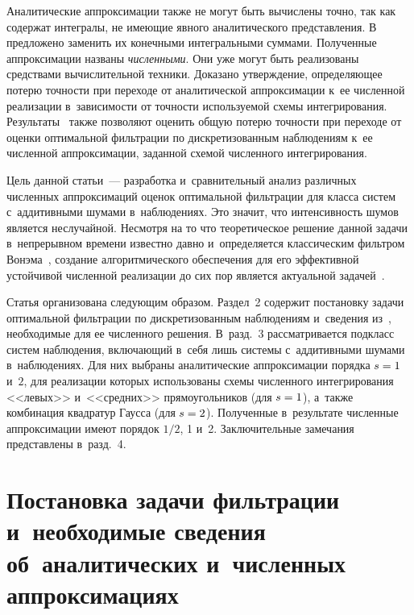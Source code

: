 \begin{multicols}{2}
 Аналитические аппроксимации также не могут быть вычислены точно, 
 так как содержат интегралы, не имеющие явного аналитического пред\-став\-ле\-ния. 
 В~\cite{B_20_1_IA} предложено заменить их конечными интегральными суммами. 
 Полученные аппроксимации названы \textit{численными}. Они уже могут 
 быть реализованы средствами вычислительной техники. Доказано утверждение, 
 определяющее потерю точности при переходе от аналитической 
 аппроксимации к~ее численной реализации в~зависимости от точности
  используемой схемы интегрирования.  Результаты~\cite{B_18_IA,   B_20_1_IA} также
 позволяют оценить общую потерю точности при переходе от оценки 
 оптимальной фильтрации по дискретизованным наблюдениям к~ее численной 
 аппроксимации, заданной схемой численного интегрирования.

Цель данной статьи~--- разработка и~сравнительный анализ различных 
численных аппроксимаций оценок оптимальной фильтрации для класса 
сис\-тем с~аддитивными шумами в~наблюдениях. Это значит, что интенсивность 
шумов является неслучайной.  Несмотря на то что теоретическое решение 
данной задачи в~непрерывном времени известно давно и~определяется 
классическим фильтром Во\-нэ\-ма~\cite{Wonham_64}, создание алгоритмического 
обеспечения для его эффективной устойчивой численной реализации до сих
 пор является актуальной задачей~\cite{YZL_04, PR_10, BGH_16}.

Статья организована следующим образом. Раздел~2 содержит постановку 
задачи оптимальной фильтрации по дискретизованным наблюдениям и~сведения 
из~\cite{B_18_IA, B_20_1_IA}, необходимые для ее численного решения. 
В~разд.~3 рассматривается подкласс сис\-тем наблюдения, включающий в~себя 
лишь сис\-те\-мы с~аддитивными шумами в~наблюдениях. Для них выбраны 
аналитические аппроксимации порядка $s\hm=1$ и~$2$, для реализации 
которых использованы схемы численного интегрирования <<левых>> и~<<средних>> 
прямоугольников (для $s\hm=1$), а~также комбинация квадратур Гаусса 
(для $s\hm=2$). Полученные в~результате численные аппроксимации имеют 
порядок ${1}/{2}$, 1 и~2. Заключительные замечания представлены в~разд.~4.


 \section{Постановка задачи фильтрации и~необходимые сведения 
 об~аналитических и~численных аппроксимациях}
 

\end{multicols}
